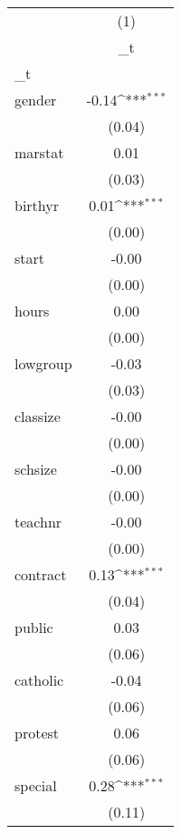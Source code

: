 \documentclass{article}
\begin{document}
{
\def\sym#1{\ifmmode^{#1}\else\(^{#1}\)\fi}
\begin{tabular}{l*{1}{c}}
\hline\hline
            &\multicolumn{1}{c}{(1)}\\
            &\multicolumn{1}{c}{\_t}\\
\hline
\_t          &                     \\
gender      &       -0.14\sym{***}\\
            &      (0.04)         \\
[1em]
marstat     &        0.01         \\
            &      (0.03)         \\
[1em]
birthyr     &        0.01\sym{***}\\
            &      (0.00)         \\
[1em]
start       &       -0.00         \\
            &      (0.00)         \\
[1em]
hours       &        0.00         \\
            &      (0.00)         \\
[1em]
lowgroup    &       -0.03         \\
            &      (0.03)         \\
[1em]
classize    &       -0.00         \\
            &      (0.00)         \\
[1em]
schsize     &       -0.00         \\
            &      (0.00)         \\
[1em]
teachnr     &       -0.00         \\
            &      (0.00)         \\
[1em]
contract    &        0.13\sym{***}\\
            &      (0.04)         \\
[1em]
public      &        0.03         \\
            &      (0.06)         \\
[1em]
catholic    &       -0.04         \\
            &      (0.06)         \\
[1em]
protest     &        0.06         \\
            &      (0.06)         \\
[1em]
special     &        0.28\sym{***}\\
            &      (0.11)         \\

\end{tabular}}
\end{document}
